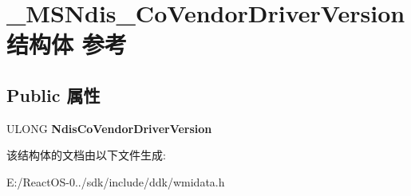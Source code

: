 \hypertarget{struct___m_s_ndis___co_vendor_driver_version}{}\section{\+\_\+\+M\+S\+Ndis\+\_\+\+Co\+Vendor\+Driver\+Version结构体 参考}
\label{struct___m_s_ndis___co_vendor_driver_version}
\subsection*{Public 属性}
\begin{DoxyCompactItemize}
\item 
\mbox{\label{struct___m_s_ndis___co_vendor_driver_version_a84d95a39a0887877741bfa4e9caee500}} 
U\+L\+O\+NG {\bfseries Ndis\+Co\+Vendor\+Driver\+Version}
\end{DoxyCompactItemize}


该结构体的文档由以下文件生成\+:\begin{DoxyCompactItemize}
\item 
E\+:/\+React\+O\+S-\/0../sdk/include/ddk/wmidata.\+h\end{DoxyCompactItemize}
